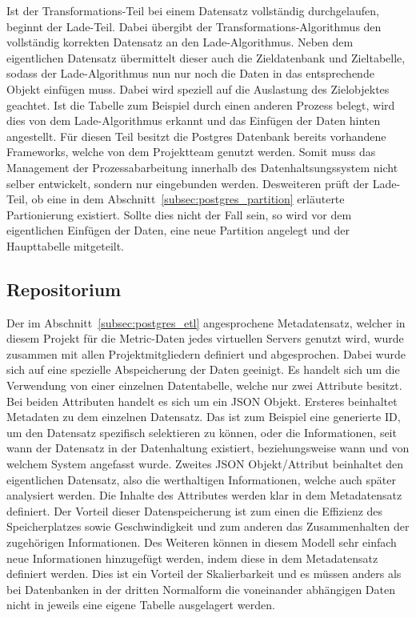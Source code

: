 Ist der Transformations\hyp{}Teil bei einem Datensatz vollständig
durchgelaufen, beginnt der Lade\hyp{}Teil. Dabei übergibt der
Transformations\hyp{}Algorithmus den vollständig korrekten Datensatz an den
Lade\hyp{}Algorithmus. Neben dem eigentlichen Datensatz übermittelt dieser
auch die Zieldatenbank und Zieltabelle, sodass der Lade\hyp{}Algorithmus nun
nur noch die Daten in das entsprechende Objekt einfügen muss. Dabei wird
speziell auf die Auslastung des Zielobjektes geachtet. Ist die Tabelle zum
Beispiel durch einen anderen Prozess belegt, wird dies von dem
Lade\hyp{}Algorithmus erkannt und das Einfügen der Daten hinten angestellt. Für
diesen Teil besitzt die Postgres Datenbank bereits vorhandene Frameworks,
welche von dem Projektteam genutzt werden. Somit muss das Management der
Prozessabarbeitung innerhalb des Datenhaltsungssystem nicht selber entwickelt,
sondern nur eingebunden werden. Desweiteren prüft der Lade\hyp{}Teil, ob eine
in dem Abschnitt~\ref{subsec:postgres_partition} erläuterte Partionierung
existiert. Sollte dies nicht der Fall sein, so wird vor dem eigentlichen
Einfügen der Daten, eine neue Partition angelegt und der Haupttabelle
mitgeteilt.
\nl%

\subsection{Repositorium}
\label{subsec:postgres_repositorium}
Der im Abschnitt~\ref{subsec:postgres_etl} angesprochene Metadatensatz, welcher
in diesem Projekt für die Metric\hyp{}Daten jedes virtuellen Servers genutzt
wird, wurde zusammen mit allen Projektmitgliedern definiert und abgesprochen.
Dabei wurde sich auf eine spezielle Abspeicherung der Daten geeinigt. Es
handelt sich um die Verwendung von einer einzelnen Datentabelle, welche nur
zwei Attribute besitzt. Bei beiden Attributen handelt es sich um ein \gls{JSON}
Objekt. Ersteres beinhaltet Metadaten zu dem einzelnen Datensatz. Das ist zum
Beispiel eine generierte ID, um den Datensatz spezifisch selektieren zu können,
oder die Informationen, seit wann der Datensatz in der Datenhaltung existiert,
beziehungsweise wann und von welchem System angefasst wurde. Zweites \gls{JSON}
Objekt/Attribut beinhaltet den eigentlichen Datensatz, also die werthaltigen
Informationen, welche auch später analysiert werden. Die Inhalte des Attributes
werden klar in dem Metadatensatz definiert. Der Vorteil dieser Datenspeicherung
ist zum einen die Effizienz des Speicherplatzes sowie Geschwindigkeit und zum
anderen das Zusammenhalten der zugehörigen Informationen. Des Weiteren können
in diesem Modell sehr einfach neue Informationen hinzugefügt werden, indem
diese in dem Metadatensatz definiert werden. Dies ist ein Vorteil der
Skalierbarkeit und es müssen anders als bei Datenbanken in der dritten
Normalform die voneinander abhängigen Daten nicht in jeweils eine eigene
Tabelle ausgelagert werden.

